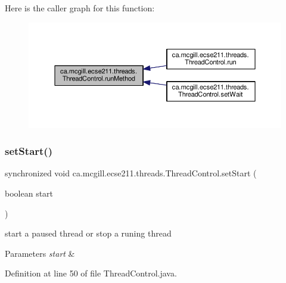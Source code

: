 Here is the caller graph for this function\+:\nopagebreak
\begin{figure}[H]
\begin{center}
\leavevmode
\includegraphics[width=350pt]{classca_1_1mcgill_1_1ecse211_1_1threads_1_1_thread_control_a2959c54bdb6c62c9d5569cdf3ccf2418_icgraph}
\end{center}
\end{figure}
\mbox{\label{classca_1_1mcgill_1_1ecse211_1_1threads_1_1_thread_control_a16221cdc4ccf637b190934549c708e1f}} 
\subsubsection{\texorpdfstring{set\+Start()}{setStart()}}
{\footnotesize\ttfamily synchronized void ca.\+mcgill.\+ecse211.\+threads.\+Thread\+Control.\+set\+Start (\begin{DoxyParamCaption}\item[{boolean}]{start }\end{DoxyParamCaption})}

start a paused thread or stop a runing thread 
\begin{DoxyParams}{Parameters}
{\em start} & \\
\hline
\end{DoxyParams}


Definition at line 50 of file Thread\+Control.\+java.


